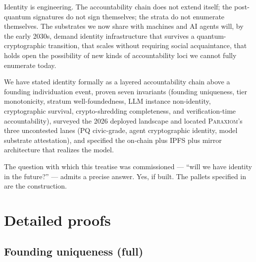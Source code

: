 \documentclass[11pt,a4paper,parskip=half-,DIV=12,headings=standardclasses]{scrartcl}
\theoremstyle{ncthm}
\theoremstyle{ncdef}
\newcommand{\paraxiom}{\textsc{Paraxiom}}
\begin{document}
Identity is engineering. The accountability chain does not extend
itself; the post-quantum signatures do not sign themselves; the
strata do not enumerate themselves. The substrates we now share with
machines and AI agents will, by the early 2030s, demand identity
infrastructure that survives a quantum-cryptographic transition, that
scales without requiring social acquaintance, that holds open the
possibility of new kinds of accountability loci we cannot fully
enumerate today.

We have stated identity formally as a layered accountability chain
above a founding individuation event, proven seven invariants
(founding uniqueness, tier monotonicity, stratum well-foundedness,
LLM instance non-identity, cryptographic survival, crypto-shredding
completeness, and verification-time accountability), surveyed the
2026 deployed landscape
and located \paraxiom's three uncontested lanes (PQ civic-grade,
agent cryptographic identity, model substrate attestation), and
specified the on-chain plus IPFS plus mirror architecture that
realizes the model.

The question with which this treatise was commissioned --- ``will we
have identity in the future?'' --- admits a precise answer. Yes, if
built. The pallets specified in  are
the construction.

\appendix

\section{Detailed proofs}\label{app:proofs}

\subsection{Founding uniqueness (full)}
\end{document}
